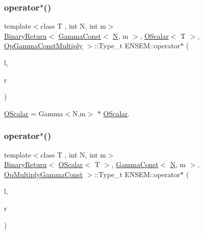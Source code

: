 \subsubsection{\texorpdfstring{operator$\ast$()}{operator*()}\hspace{0.1cm}{\footnotesize\ttfamily [2/5]}}
{\footnotesize\ttfamily template$<$class T , int N, int m$>$ \\
\mbox{\hyperlink{structENSEM_1_1BinaryReturn}{Binary\+Return}}$<$ \mbox{\hyperlink{classENSEM_1_1GammaConst}{Gamma\+Const}}$<$ \mbox{\hyperlink{operator__name__util_8cc_a7722c8ecbb62d99aee7ce68b1752f337}{N}}, m $>$, \mbox{\hyperlink{classENSEM_1_1OScalar}{O\+Scalar}}$<$ T $>$, \mbox{\hyperlink{structENSEM_1_1OpGammaConstMultiply}{Op\+Gamma\+Const\+Multiply}} $>$\+::Type\+\_\+t E\+N\+S\+E\+M\+::operator$\ast$ (\begin{DoxyParamCaption}\item[{const \mbox{\hyperlink{classENSEM_1_1GammaConst}{Gamma\+Const}}$<$ \mbox{\hyperlink{operator__name__util_8cc_a7722c8ecbb62d99aee7ce68b1752f337}{N}}, m $>$ \&}]{l,  }\item[{const \mbox{\hyperlink{classENSEM_1_1OScalar}{O\+Scalar}}$<$ T $>$ \&}]{r }\end{DoxyParamCaption})\hspace{0.3cm}{\ttfamily [inline]}}



\mbox{\hyperlink{classENSEM_1_1OScalar}{O\+Scalar}} = Gamma$<$\+N,m$>$ $\ast$ \mbox{\hyperlink{classENSEM_1_1OScalar}{O\+Scalar}}. 

\mbox{\label{group__obsscalar_ga1a9ed6642b9c94843e7a8c143c2f0236}} 
\subsubsection{\texorpdfstring{operator$\ast$()}{operator*()}\hspace{0.1cm}{\footnotesize\ttfamily [3/5]}}
{\footnotesize\ttfamily template$<$class T , int N, int m$>$ \\
\mbox{\hyperlink{structENSEM_1_1BinaryReturn}{Binary\+Return}}$<$ \mbox{\hyperlink{classENSEM_1_1OScalar}{O\+Scalar}}$<$ T $>$, \mbox{\hyperlink{classENSEM_1_1GammaConst}{Gamma\+Const}}$<$ \mbox{\hyperlink{operator__name__util_8cc_a7722c8ecbb62d99aee7ce68b1752f337}{N}}, m $>$, \mbox{\hyperlink{structENSEM_1_1OpMultiplyGammaConst}{Op\+Multiply\+Gamma\+Const}} $>$\+::Type\+\_\+t E\+N\+S\+E\+M\+::operator$\ast$ (\begin{DoxyParamCaption}\item[{const \mbox{\hyperlink{classENSEM_1_1OScalar}{O\+Scalar}}$<$ T $>$ \&}]{l,  }\item[{const \mbox{\hyperlink{classENSEM_1_1GammaConst}{Gamma\+Const}}$<$ \mbox{\hyperlink{operator__name__util_8cc_a7722c8ecbb62d99aee7ce68b1752f337}{N}}, m $>$ \&}]{r }\end{DoxyParamCaption})\hspace{0.3cm}{\ttfamily [inline]}}



